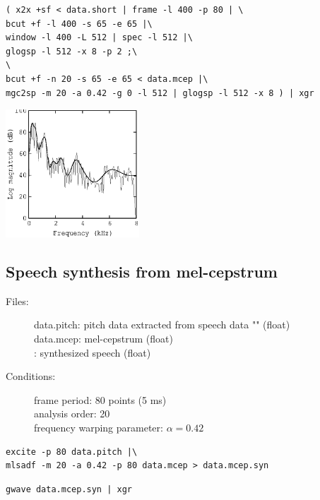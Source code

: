 \documentclass[a4paper,10pt]{article}
\begin{document}
\begin{verbatim}
( x2x +sf < data.short | frame -l 400 -p 80 | \
bcut +f -l 400 -s 65 -e 65 |\
window -l 400 -L 512 | spec -l 512 |\
glogsp -l 512 -x 8 -p 2 ;\
\
bcut +f -n 20 -s 65 -e 65 < data.mcep |\
mgc2sp -m 20 -a 0.42 -g 0 -l 512 | glogsp -l 512 -x 8 ) | xgr
\end{verbatim}

\includegraphics[width=5cm]{eps/data.mcep.glogsp.eps}

\subsection{Speech synthesis from mel-cepstrum}

\begin{description}
\item[Files:]
  data.pitch: pitch data extracted from speech data
           ""
           (float)\\
  data.mcep: mel-cepstrum (float) \\
  :
  synthesized speech (float)
\item[Conditions:]
  frame period: 80 points (5 ms)\\
  analysis order: 20\\
  frequency warping parameter: $\alpha = 0.42$
\end{description}

\begin{verbatim}
excite -p 80 data.pitch |\
mlsadf -m 20 -a 0.42 -p 80 data.mcep > data.mcep.syn
\end{verbatim}

\begin{verbatim}
gwave data.mcep.syn | xgr
\end{verbatim}
\end{document}
